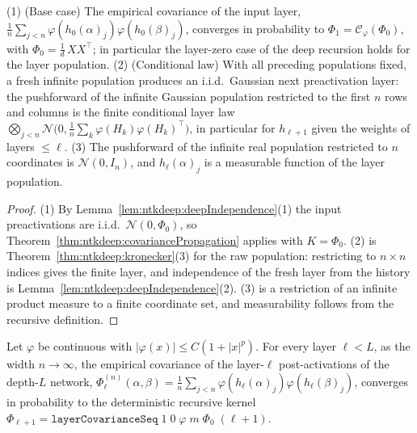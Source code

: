 \begin{lemma}\label{lem:ntkdeep:freshLayer}
  \leanok
(1) (Base case) The empirical covariance of the input layer, $\frac1n\sum_{j<n}\varphi(h_0(\alpha)_j)\varphi(h_0(\beta)_j)$, converges in probability to $\Phi_1=\mathcal C_\varphi(\Phi_0)$, with $\Phi_0=\frac1d\,XX^\top$; in particular the layer-zero case of the deep recursion holds for the layer population.
(2) (Conditional law) With all preceding populations fixed, a fresh infinite population produces an i.i.d.\ Gaussian next preactivation layer: the pushforward of the infinite Gaussian population restricted to the first $n$ rows and columns is the finite conditional layer law
$\bigotimes_{j<n}\mathcal N\bigl(0,\tfrac1n\sum_k\varphi(H_k)\varphi(H_k)^\top\bigr)$, in particular for $h_{\ell+1}$ given the weights of layers $\le\ell$.
(3) The pushforward of the infinite real population restricted to $n$ coordinates is $\mathcal N(0,I_n)$, and $h_\ell(\alpha)_j$ is a measurable function of the layer population.
\end{lemma}

\begin{proof}
  \leanok
(1) By Lemma~\ref{lem:ntkdeep:deepIndependence}(1) the input preactivations are i.i.d.\ $\mathcal N(0,\Phi_0)$, so Theorem~\ref{thm:ntkdeep:covariancePropagation} applies with $K=\Phi_0$. (2) is Theorem~\ref{thm:ntkdeep:kronecker}(3) for the raw population: restricting to $n\times n$ indices gives the finite layer, and independence of the fresh layer from the history is Lemma~\ref{lem:ntkdeep:deepIndependence}(2).
(3) is a restriction of an infinite product measure to a finite coordinate set, and measurability follows from the recursive definition.
\end{proof}

\begin{theorem}\label{thm:ntkdeep:deepCovariance}
  \leanok
Let $\varphi$ be continuous with $|\varphi(x)|\le C(1+|x|^p)$. For every layer $\ell<L$, as the width $n\to\infty$, the empirical covariance of the layer-$\ell$ post-activations of the depth-$L$ network,
$\Phi^{(n)}_\ell(\alpha,\beta)=\frac1n\sum_{j<n}\varphi(h_\ell(\alpha)_j)\varphi(h_\ell(\beta)_j)$, converges in probability to the deterministic recursive kernel $\Phi_{\ell+1}=\texttt{layerCovarianceSeq}\;1\;0\;\varphi\;m\;\Phi_0\;(\ell+1)$.
\end{theorem}

